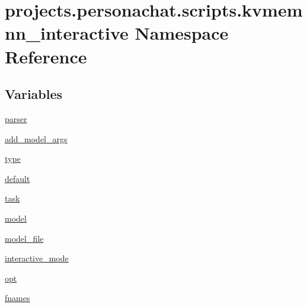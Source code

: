 \hypertarget{namespaceprojects_1_1personachat_1_1scripts_1_1kvmemnn__interactive}{}\section{projects.\+personachat.\+scripts.\+kvmemnn\+\_\+interactive Namespace Reference}
\label{namespaceprojects_1_1personachat_1_1scripts_1_1kvmemnn__interactive}
\subsection*{Variables}
\begin{DoxyCompactItemize}
\item 
\hyperlink{namespaceprojects_1_1personachat_1_1scripts_1_1kvmemnn__interactive_aa6bd5f5f1d91f5e7edc9da941b6de0a3}{parser}
\item 
\hyperlink{namespaceprojects_1_1personachat_1_1scripts_1_1kvmemnn__interactive_a5450b4eed2846577dbec4810fcc50d69}{add\+\_\+model\+\_\+args}
\item 
\hyperlink{namespaceprojects_1_1personachat_1_1scripts_1_1kvmemnn__interactive_a25e48e7bed4c9d56601844942f2afa61}{type}
\item 
\hyperlink{namespaceprojects_1_1personachat_1_1scripts_1_1kvmemnn__interactive_a84b81c4d7eeffba8f346ef0bb317226f}{default}
\item 
\hyperlink{namespaceprojects_1_1personachat_1_1scripts_1_1kvmemnn__interactive_a05b142cd24f6960a62f280228e0d9f42}{task}
\item 
\hyperlink{namespaceprojects_1_1personachat_1_1scripts_1_1kvmemnn__interactive_a09adc68544b10da3ae5f69b2a98d1f23}{model}
\item 
\hyperlink{namespaceprojects_1_1personachat_1_1scripts_1_1kvmemnn__interactive_a24769b16f270ac6c8db28bb21925812b}{model\+\_\+file}
\item 
\hyperlink{namespaceprojects_1_1personachat_1_1scripts_1_1kvmemnn__interactive_aa01100f1a72819cb5a2d75b4c33084a3}{interactive\+\_\+mode}
\item 
\hyperlink{namespaceprojects_1_1personachat_1_1scripts_1_1kvmemnn__interactive_ab484b07bfdf7096326f2d79a4ee1b258}{opt}
\item 
\hyperlink{namespaceprojects_1_1personachat_1_1scripts_1_1kvmemnn__interactive_aaa67dfd1d603abd98394dafc5ba2bf7e}{fnames}
\end{DoxyCompactItemize}


